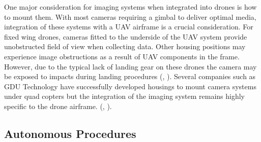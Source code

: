 One major consideration for imaging systems when integrated into drones is how to mount them. With most cameras requiring a gimbal to deliver optimal media, integration of these systems with a UAV airframe is a crucial consideration. For fixed wing drones, cameras fitted to the underside of the UAV system provide unobstructed field of view when collecting data. Other housing positions may experience image obstructions as a result of UAV components in the frame. However, due to the typical lack of landing gear on these drones the camera may be exposed to impacts during landing procedures (\citeauthor{Sam5}, \citeyear{Sam5}). Several companies such as GDU Technology have successfully developed housings to mount camera systems under quad copters but the integration of the imaging system remains highly specific to the drone airframe. (\citeauthor{Sam5}, \citeyear{Sam5}).
% 


\subsection{Autonomous Procedures} 

% 






